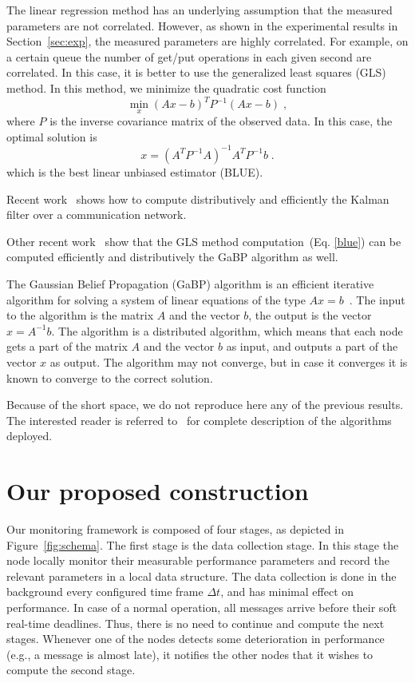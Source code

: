 \documentclass[times, 10pt,twocolumn]{article}
\def\BE{\begin{equation}}
\def\EE{\end{equation}}
\begin{document}
The linear regression method has an underlying assumption that the measured parameters are not correlated.
However, as shown in the experimental results in Section~\ref{sec:exp}, the measured parameters are highly correlated.
For example, on a certain queue the number of get/put operations in each given second are correlated. In this case,
it is better to use the generalized least squares (GLS) method. In this method, we minimize the quadratic cost function
\BE \min_x (Ax-b)^TP^{-1}(Ax-b)\;, \label{ls} \EE where $P$ is the inverse covariance matrix of the observed data. In this case, the optimal
solution is \BE x = (A^TP^{-1}A)^{-1}A^TP^{-1}b \;. \label{blue} \EE which is the best linear unbiased estimator (BLUE).



\label{sec:gabp}
Recent work~\cite{Allerton08-2} shows how to compute distributively and efficiently the Kalman filter over a communication network.


Other recent work~\cite{Allerton,ISIT1,ISIT2} show that the GLS method computation~(Eq. \ref{blue}) can be computed efficiently and distributively the GaBP algorithm as well.


The Gaussian Belief Propagation (GaBP) algorithm is an efficient iterative algorithm for solving a system
of linear equations of the type $Ax=b$~\cite{ISIT1}. The input to the algorithm is the matrix $A$ and the vector $b$, the output is the vector $x = A^{-1}b$. The algorithm is a distributed algorithm, which means that each node gets a part of the matrix $A$ and the vector $b$
as input, and outputs a part of the vector $x$ as output. The algorithm may not converge, but in case it converges
it is known to converge to the correct solution.

Because of the short space, we do not reproduce here any of the previous results. The interested reader is referred
to~\cite{Allerton08-2,ISIT1,ISIT2,Allerton} for complete description of the algorithms deployed.




\section{Our proposed construction}
\label{sec:const}
Our monitoring framework is composed of four stages, as depicted in Figure~\ref{fig:schema}. 
The first stage is the data collection stage. In this stage the node locally monitor their measurable performance
parameters and record the relevant parameters in a local data structure. The data collection is done in the background every
configured time frame $\Delta t$, and has minimal effect on performance. In case of a normal operation, all messages
arrive before their soft real-time deadlines. Thus, there is no need to continue and compute the next stages.
Whenever one of the nodes detects some deterioration in performance (e.g., a message is almost late), it notifies the other nodes that it wishes to compute the second stage.
\end{document}
